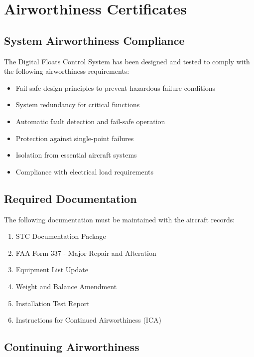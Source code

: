 \documentclass[12pt,a4paper,twoside,openright]{book}
\begin{document}
\section{Airworthiness Certificates}

\subsection{System Airworthiness Compliance}

The Digital Floats Control System has been designed and tested to comply with the following airworthiness requirements:

\begin{itemize}
    \item Fail-safe design principles to prevent hazardous failure conditions
    \item System redundancy for critical functions
    \item Automatic fault detection and fail-safe operation
    \item Protection against single-point failures
    \item Isolation from essential aircraft systems
    \item Compliance with electrical load requirements
\end{itemize}

\subsection{Required Documentation}

The following documentation must be maintained with the aircraft records:

\begin{enumerate}
    \item STC Documentation Package
    \item FAA Form 337 - Major Repair and Alteration
    \item Equipment List Update
    \item Weight and Balance Amendment
    \item Installation Test Report
    \item Instructions for Continued Airworthiness (ICA)
\end{enumerate}

\subsection{Continuing Airworthiness}
\end{document}
